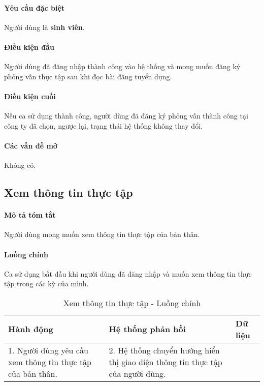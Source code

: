 \documentclass[./../main.tex]{subfiles}
\begin{document}
\paragraph*{Yêu cầu đặc biệt}

Người dùng là \textbf{sinh viên}.

\paragraph*{Điều kiện đầu}

Người dùng đã đăng nhập thành công vào hệ thống và mong muốn đăng ký
phỏng vấn thực tập sau khi đọc bài đăng tuyển dụng.

\paragraph*{Điều kiện cuối}

Nếu ca sử dụng thành công, người dùng đã đăng ký phỏng vấn thành công
tại công ty đã chọn, ngược lại, trạng thái hệ thống không thay đổi.

\paragraph*{Các vấn đề mở}

Không có.

\subsection{Xem thông tin thực tập}

\paragraph*{Mô tả tóm tắt}

Người dùng mong muốn xem thông tin thực tập của bản thân.

\paragraph*{Luồng chính} Ca sử dụng bắt đầu khi người dùng đã đăng nhập và muốn xem thông tin thực tập trong các kỳ của mình.

\begin{table}[H]
  \caption{Xem thông tin thực tập - Luồng chính}
  \label{tab:read_internship_info}
  \begin{tabularx}{\textwidth}{|X|X|X|}
  \hline
  \textbf{Hành động}                                      & \textbf{Hệ thống phản hồi}                                                  & \textbf{Dữ liệu} \\ \hline
  1. Người dùng yêu cầu xem thông tin thực tập của bản thân. & 2. Hệ thống chuyển hướng hiển thị giao diện thông tin thực tập của người dùng. &                  \\ \hline
  \end{tabularx}
\end{table}
\end{document}
